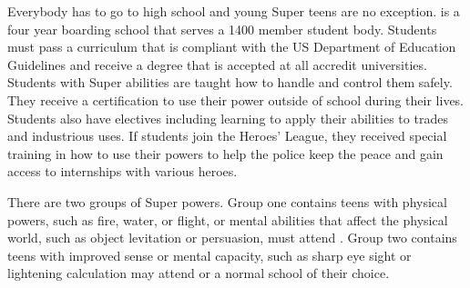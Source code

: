 \documentclass[blue]{LRSguildcamp1}
\begin{document}
\name{\bTest{}}

Everybody has to go to high school and young Super teens are no exception. \pSuperSchool{} is a four year boarding school that serves a 1400 member student body. Students must pass a curriculum that is compliant with the US Department of Education Guidelines and receive a degree that is accepted at all accredit universities. Students with Super abilities are taught how to handle and control them safely. They receive a certification to use their power outside of school during their lives. Students also have electives including learning to apply their abilities to trades and industrious uses.  If students join the Heroes' League, they received special training in how to use their powers to help the police keep the peace and gain access to internships with various heroes. 

There are two groups of Super powers. Group one contains teens with physical powers, such as fire, water, or flight, or mental abilities that affect the physical world, such as object levitation or persuasion, must attend \pSuperShool{}. Group two contains teens with improved sense or mental capacity, such as sharp eye sight or lightening calculation may attend \pSuperSchool{} or a normal school of their choice.  
\end{document}
